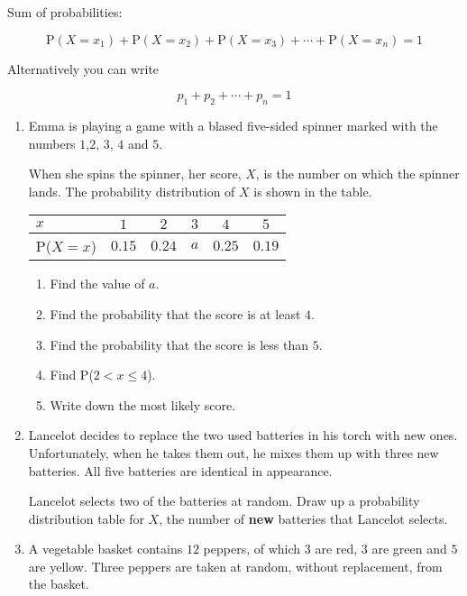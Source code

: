 Sum of probabilities:

\[
\text{P}(X=x_1) + \text{P}(X=x_2) + \text{P}(X=x_3) + \cdots + \text{P}(X=x_n) =1
\]	

Alternatively you can write 

\[
p_1 + p_2 +\cdots + p_n =1
\]


\exercise   %

\begin{enumerate}
	\item Emma is playing a game with a blased  five-sided spinner marked with the numbers $1$,$2$, $3$, $4$ and $5$.
	
	When she spins the spinner, her score, $X$, is the number on which the spinner lands. The probability distribution of $X$ is shown in the table. 
	
	\begin{table}[!htpb]
		\centering
		\begin{tabular}{|l|c|c|c|c|c|}
			\hline
			$x $     & $1$ & $2$ & $3$ & $4$ & $5$ \\ \hline
			P($X=x$) & $0.15$ & $0.24$ & $a$ & $0.25$ & $0.19$ \\ \hline
		\end{tabular}
	\end{table}
	
	\begin{enumerate}
		\item Find the value of $a$.
		\item Find the probability that the score is at least $4$.
		\item Find the probability that the score is less than  $5$.
		\item Find P($2<x\leqslant 4$).
		\item Write down the most likely score.
	\end{enumerate}
	
	
	\item Lancelot decides to replace the two used batteries in his torch with new ones. Unfortunately, when he takes them out, he mixes them up with three new batteries. All five batteries are identical in appearance.
	
	Lancelot selects two of the batteries at random. Draw up a probability distribution table for $X$,  the number of \textbf{new} batteries that Lancelot selects.
	
	
	\item A vegetable basket contains $12$ peppers, of which $3$ are red, $3$ are green and $5$ are yellow. Three peppers are taken at random, without replacement, from the basket.
	

\end{enumerate}
